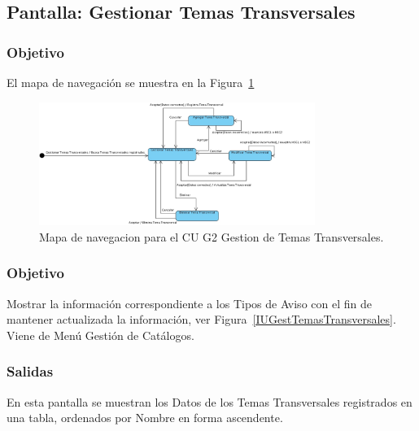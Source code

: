 \subsection{Pantalla: Gestionar Temas Transversales}
\subsubsection{Objetivo}
	El mapa de navegación se muestra en la Figura~\ref{fig:mapaNavegacionCUG2}

   \begin{figure}[hbpt!]
 		\centering
 			\includegraphics[width=0.8\textwidth]{images/CUG2/MapaNavegacion.jpg}
 		\caption{Mapa de navegacion para el CU G2 Gestion de Temas Transversales.}
		\label{fig:mapaNavegacionCUG2}
 	\end{figure}

\subsubsection{Objetivo}
  Mostrar la información correspondiente a los Tipos de Aviso con el fin de mantener actualizada la información, ver Figura~\ref{IUGestTemasTransversales}. Viene de Menú Gestión de Catálogos.


\subsubsection{Salidas}
  En esta pantalla se muestran los Datos de los Temas Transversales registrados en una tabla, ordenados por Nombre en forma ascendente.

